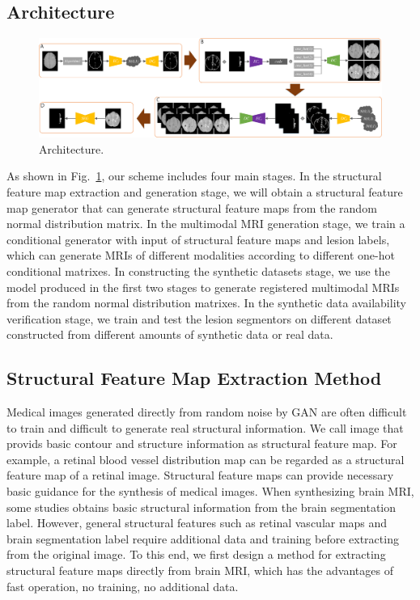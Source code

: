 \documentclass[letterpaper]{article} %
\begin{document}
\subsection{Architecture}
\begin{figure}[t]
	\centering
	\includegraphics[width=0.95\columnwidth]{figures/architecture}
	\caption{Architecture.}
	\label{architecture}
\end{figure}
As shown in Fig.~\ref{architecture}, our scheme includes four main stages. 
In the structural feature map extraction and generation stage, we will obtain a structural feature map generator that can generate structural feature maps from the random normal distribution matrix. 
In the multimodal MRI generation stage, we train a conditional generator with input of structural feature maps and lesion labels, which can generate MRIs of different modalities according to different one-hot conditional matrixes.
In constructing the synthetic datasets stage, we use the model produced in the first two stages to generate registered multimodal MRIs  from the random normal distribution matrixes. 
In the synthetic data availability verification stage, we train and test the lesion segmentors on different dataset constructed from different amounts of synthetic data or real data.

\subsection{Structural Feature Map Extraction Method}
Medical images generated directly from random noise by GAN are often difficult to train and difficult to generate real structural information. We call image that provids basic contour and structure information as structural feature map. For example, a retinal blood vessel distribution map can be regarded as a structural feature map of a retinal image\cite{41costa2017towards}. Structural feature maps can provide necessary basic guidance for the synthesis of medical images. When synthesizing brain MRI, some studies obtains basic structural information from the brain segmentation label\cite{4shin2018medical}. However, general structural features such as retinal vascular maps and brain segmentation label require additional data and training before extracting from the original image. To this end, we first design a method for extracting structural feature maps directly from brain MRI, which has the advantages of fast operation, no training, no additional data.
\end{document}
